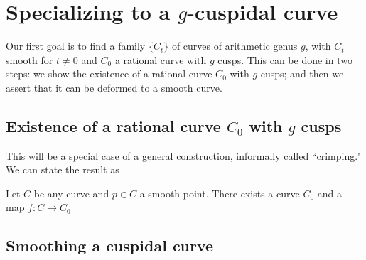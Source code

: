 %
%

\section{Specializing to a $g$-cuspidal curve}

Our first goal is to find a family $\{C_t\}$ of curves of arithmetic genus $g$, with $C_t$ smooth for $t \neq 0$ and $C_0$ a rational curve with $g$ cusps. This can be done in two steps: we show the existence of a rational curve $C_0$ with $g$ cusps; and then we assert that it can be deformed to a smooth curve.

\subsection{Existence of a rational curve $C_0$ with $g$ cusps}

This will be a special case of a general construction, informally called ``crimping." We can state the result as

\begin{proposition}
Let $C$ be any curve and $p \in C$ a smooth point. There exists a curve $C_0$ and a map $f : C \to C_0$
\end{proposition}

\subsection{Smoothing a cuspidal curve}


